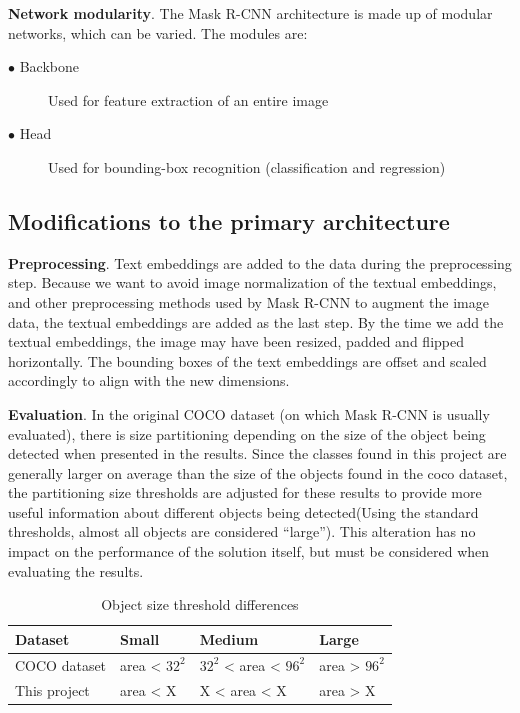 \documentclass[english, bibtex]{kththesis}
\begin{document}
\textbf{Network modularity}. The Mask R-CNN architecture is made up of modular networks, which can be varied. The modules are:

\begin{description}
\item[$\bullet$ Backbone] Used for feature extraction of an entire image
\item[$\bullet$ Head] Used for bounding-box recognition (classification and regression)
\end{description}

\subsection{Modifications to the primary architecture}

\textbf{Preprocessing}. Text embeddings are added to the data during the preprocessing step. Because we want to avoid image normalization of the textual embeddings, and other preprocessing methods used by Mask R-CNN to augment the image data, the textual embeddings are added as the last step. By the time we add the textual embeddings, the image may have been resized, padded and flipped horizontally. The bounding boxes of the text embeddings are offset and scaled accordingly to align with the new dimensions.

\textbf{Evaluation}. In the original COCO dataset (on which Mask R-CNN is usually evaluated), there is size partitioning depending on the size of the object being detected when presented in the results. Since the classes found in this project are generally larger on average than the size of the objects found in the coco dataset, the partitioning size thresholds are adjusted for these results to provide more useful information about different objects being detected(Using the standard thresholds, almost all objects are considered “large”). This alteration has no impact on the performance of the solution itself, but must be considered when evaluating the results.

\begin{table}[!htb]
  \begin{center}
    \caption{Object size threshold differences}
    \label{tab:objectsizes}
    \begin{tabular}{l|l|l|l} %
    \textbf{Dataset} & \textbf{Small} & \textbf{Medium} & \textbf{Large}  \\ 
    \hline
    COCO dataset & area < $32^2$ & $32^2$ < area < $96^2$ & area > $96^2$  \\    \hline
    This project & area < X & X < area < X & area > X \\    \hline
    \end{tabular}
  \end{center}
\end{table}
\end{document}
